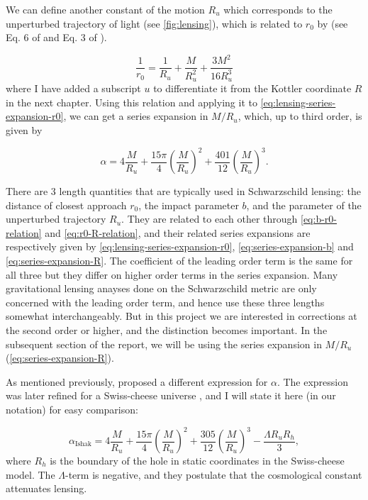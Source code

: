 We can define another constant of the motion $R_u$ which corresponds to the unperturbed trajectory of light (see \autoref{fig:lensing}), which is related to $r_0$ by (see Eq. 6 of \citet{ishak2008new} and Eq. 3 of \citet{butcher2016no}).

\begin{equation}
  \frac{1}{r_0} = \frac{1}{R_u} + \frac{M}{R_u^2} + \frac{3M^2}{16R_u^3}
  \label{eq:r0-R-relation}
\end{equation}
where I have added a subscript $u$ to differentiate it from the Kottler coordinate $R$ in the next chapter. Using this relation and applying it to \autoref{eq:lensing-series-expansion-r0}, we can get a series expansion in $M/R_u$, which, up to third order, is given by

\begin{equation}
  \alpha = 4 \frac{M}{R_u} + \frac{15\pi}{4} \left ( \frac{M}{R_u} \right )^2 + \frac{401}{12} \left ( \frac{M}{R_u} \right )^3.
  \label{eq:series-expansion-R}
\end{equation}

There are 3 length quantities that are typically used in Schwarzschild lensing: the distance of closest approach $r_0$, the impact parameter $b$, and the parameter of the unperturbed trajectory $R_u$. They are related to each other through \autoref{eq:b-r0-relation} and \autoref{eq:r0-R-relation}, and their related series expansions are respectively given by \autoref{eq:lensing-series-expansion-r0}, \autoref{eq:series-expansion-b} and \autoref{eq:series-expansion-R}. The coefficient of the leading order term is the same for all three but they differ on higher order terms in the series expansion. Many gravitational lensing anayses done on the Schwarzschild metric are only concerned with the leading order term, and hence use these three lengths somewhat interchangeably. But in this project we are interested in corrections at the second order or higher, and the distinction becomes important. In the subsequent section of the report, we will be using the series expansion in $M/R_u$ (\autoref{eq:series-expansion-R}). 

As mentioned previously, \citet{rindler2007contribution} proposed a different expression for $\alpha$. The expression was later refined for a Swiss-cheese universe \citep{ishak2008new}, and I will state it here (in our notation) for easy comparison:

\begin{equation}
  \alpha_{\text{Ishak}} = 4 \frac{M}{R_u} + \frac{15\pi}{4} \left ( \frac{M}{R_u} \right )^2 + \frac{305}{12} \left ( \frac{M}{R_u} \right )^3 - \frac{\Lambda R_u R_h}{3},
  \label{eq:rindler-ishak-alpha}
\end{equation}
where $R_h$ is the boundary of the hole in static coordinates in the Swiss-cheese model. The $\Lambda$-term is negative, and they postulate that the cosmological constant attenuates lensing. 

